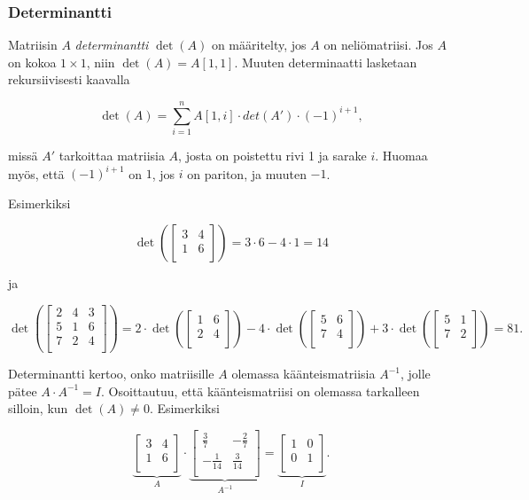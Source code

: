\subsubsection{Determinantti}

Matriisin $A$ \textit{determinantti} $\det(A)$
on määritelty, jos $A$ on neliömatriisi.
Jos $A$ on kokoa $1 \times 1$,
niin $\det(A)=A[1,1]$.
Muuten determinaatti lasketaan rekursiivisesti
kaavalla

\[\det(A)=\sum_{i=1}^n A[1,i] \cdot det(A') \cdot (-1)^{i+1},\]

missä $A'$ tarkoittaa matriisia $A$,
josta on poistettu rivi 1 ja sarake $i$.
Huomaa myös, että $(-1)^{i+1}$ on $1$,
jos $i$ on pariton, ja muuten $-1$.

Esimerkiksi

\[
\det(
 \begin{bmatrix}
  3 & 4 \\
  1 & 6 \\
 \end{bmatrix}
) = 3 \cdot 6 - 4 \cdot 1 = 14 
\]

ja

\[
\det(
 \begin{bmatrix}
  2 & 4 & 3 \\
  5 & 1 & 6 \\
  7 & 2 & 4 \\
 \end{bmatrix}
) = 
2 \cdot
\det(
 \begin{bmatrix}
  1 & 6 \\
  2 & 4 \\
 \end{bmatrix}
)
-4 \cdot
\det(
 \begin{bmatrix}
  5 & 6 \\
  7 & 4 \\
 \end{bmatrix}
)
+3 \cdot
\det(
 \begin{bmatrix}
  5 & 1 \\
  7 & 2 \\
 \end{bmatrix}
) = 81.
\]

Determinantti kertoo, onko matriisille
$A$ olemassa käänteismatriisia
$A^{-1}$, jolle pätee $A \cdot A^{-1} = I$.
Osoittautuu, että käänteismatriisi on olemassa
tarkalleen silloin, kun $\det(A) \neq 0$.
Esimerkiksi

\[
\underbrace{
 \begin{bmatrix}
  3 & 4 \\
  1 & 6 \\
 \end{bmatrix}
}_{A}
\cdot
\underbrace{
 \begin{bmatrix}
  \frac{3}{7} & -\frac{2}{7} \\
  -\frac{1}{14} & \frac{3}{14} \\
 \end{bmatrix}
}_{A^{-1}}
=
\underbrace{
 \begin{bmatrix}
  1 & 0 \\
  0 & 1 \\
 \end{bmatrix}
}_{I}.
\]

